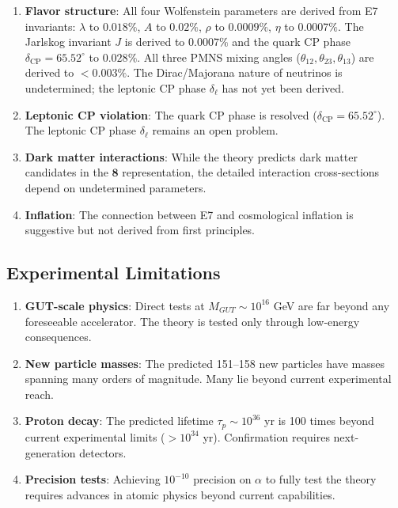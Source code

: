 \documentclass[11pt,a4paper]{article}
\begin{document}
\begin{enumerate}
\item \textbf{Flavor structure}: All four Wolfenstein parameters are derived from E7 invariants: $\lambda$ to $0.018\%$, $A$ to $0.02\%$, $\rho$ to $0.0009\%$, $\eta$ to $0.0007\%$. The Jarlskog invariant $J$ is derived to $0.0007\%$ and the quark CP phase $\delta_{\text{CP}} = 65.52^\circ$ to $0.028\%$. All three PMNS mixing angles ($\theta_{12}, \theta_{23}, \theta_{13}$) are derived to $< 0.003\%$. The Dirac/Majorana nature of neutrinos is undetermined; the leptonic CP phase $\delta_\ell$ has not yet been derived.

\item \textbf{Leptonic CP violation}: The quark CP phase is resolved ($\delta_{\text{CP}} = 65.52^\circ$). The leptonic CP phase $\delta_\ell$ remains an open problem.

\item \textbf{Dark matter interactions}: While the theory predicts dark matter candidates in the $\mathbf{8}$ representation, the detailed interaction cross-sections depend on undetermined parameters.

\item \textbf{Inflation}: The connection between E7 and cosmological inflation is suggestive but not derived from first principles.
\end{enumerate}

\subsection{Experimental Limitations}

\begin{enumerate}
\item \textbf{GUT-scale physics}: Direct tests at $M_{GUT} \sim 10^{16}$ GeV are far beyond any foreseeable accelerator. The theory is tested only through low-energy consequences.

\item \textbf{New particle masses}: The predicted 151--158 new particles have masses spanning many orders of magnitude. Many lie beyond current experimental reach.

\item \textbf{Proton decay}: The predicted lifetime $\tau_p \sim 10^{36}$ yr is 100 times beyond current experimental limits ($> 10^{34}$ yr). Confirmation requires next-generation detectors.

\item \textbf{Precision tests}: Achieving $10^{-10}$ precision on $\alpha$ to fully test the theory requires advances in atomic physics beyond current capabilities.
\end{enumerate}
\end{document}
